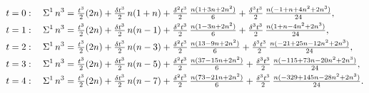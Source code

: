 \begin{example}
  \begin{align*}
    t=0:\quad
    \Sigma^{1}\,{n}^{3}
    &=
    \tfrac{t^3}{2}(2n)
    +
    \tfrac{\delta t^3}{2}\, n(1+n)
    +
    \tfrac{\delta^2 t^3}{2}\,\tfrac{n(1+3n+2n^2)}{6}
    +
    \tfrac{\delta^3 t^3}{2}\,\tfrac{n(-1+n+4n^2+2n^3)}{24},
    \\
    t=1:\quad
    \Sigma^{1}\,{n}^{3}
    &=
    \tfrac{t^3}{2}(2n)
    +
    \tfrac{\delta t^3}{2}\, n(n-1)
    +
    \tfrac{\delta^2 t^3}{2}\,\tfrac{n(1-3n+2n^2)}{6}
    +
    \tfrac{\delta^3 t^3}{2}\,\tfrac{n(1+n-4n^2+2n^3)}{24},
    \\
    t=2:\quad
    \Sigma^{1}\,{n}^{3}
    &=
    \tfrac{t^3}{2}(2n)
    +
    \tfrac{\delta t^3}{2}\, n(n-3)
    +
    \tfrac{\delta^2 t^3}{2}\,\tfrac{n(13-9n+2n^2)}{6}
    +
    \tfrac{\delta^3 t^3}{2}\,\tfrac{n(-21+25n-12n^2+2n^3)}{24},
    \\
    t=3:\quad
    \Sigma^{1}\,{n}^{3}
    &=
    \tfrac{t^3}{2}(2n)
    +
    \tfrac{\delta t^3}{2}\, n(n-5)
    +
    \tfrac{\delta^2 t^3}{2}\,\tfrac{n(37-15n+2n^2)}{6}
    +
    \tfrac{\delta^3 t^3}{2}\,\tfrac{n(-115+73n-20n^2+2n^3)}{24},
    \\
    t=4:\quad
    \Sigma^{1}\,{n}^{3}
    &=
    \tfrac{t^3}{2}(2n)
    +
    \tfrac{\delta t^3}{2}\, n(n-7)
    +
    \tfrac{\delta^2 t^3}{2}\,\tfrac{n(73-21n+2n^2)}{6}
    +
    \tfrac{\delta^3 t^3}{2}\,\tfrac{n(-329+145n-28n^2+2n^3)}{24}.
  \end{align*}
\end{example}
